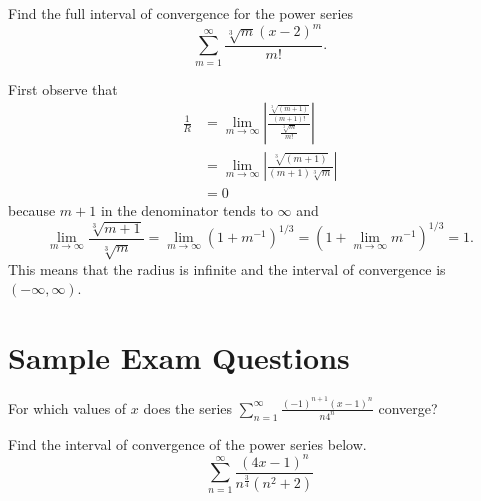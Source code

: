 \documentclass{ximera}
\begin{document}
\begin{question}%

Find the full interval of convergence for the power series \[\sum_{m=1}^{\infty} \frac{\sqrt[3]{m}(x - 2)^m }{m!}.\]
\begin{multiplechoice}
\choice{\(\displaystyle \left[1,3\right)\)}
\choice{\(\displaystyle \left(1,3\right]\)}
\choice{\(\displaystyle \left[1,3\right]\)}
\choice[correct]{\(\displaystyle \left(-\infty,\infty\right)\)}
\end{multiplechoice}
\begin{feedback}
First observe that 
\[\begin{aligned}
\frac{1}{R} & = \lim_{m\rightarrow \infty} \left| \frac{\frac{\sqrt[3]{{(m+1)}} }{{(m+1)}!} }{\frac{\sqrt[3]{m} }{m!}} \right| \\
& = \lim_{m\rightarrow \infty} \left| \frac{\sqrt[3]{{(m+1)}} }{(m+1)\sqrt[3]{m} } \right| \\
& = 0
\end{aligned}\]
because \(m+1\) in the denominator tends to \(\infty\) and \[\lim_{m \rightarrow \infty} \frac{\sqrt[3]{m+1}}{\sqrt[3]{m}} = \lim_{m \rightarrow \infty} \left( 1 + m^{-1} \right)^{1/3} = \left( 1 + \lim_{m \rightarrow \infty} m^{-1} \right)^{1/3} = 1.\]
This means that the radius is infinite and the interval of convergence is \((-\infty,\infty)\).
\end{feedback}

\end{question}

\section*{Sample Exam Questions}

\begin{question}%

For which values of \(x\) does the series \(\displaystyle \sum_{n=1}^\infty \frac{(-1)^{n+1}(x-1)^n}{n 4^n}\) converge?
\begin{multiplechoice}
\end{multiplechoice}

\end{question}

\begin{question}%

Find the interval of convergence of the power series below.
\[ \sum_{n=1}^\infty \frac{(4x-1)^n}{n^\frac{3}{4} (n^2+2)} \]
\begin{multiplechoice}
\choice{\(\displaystyle \left( 0 , \frac{1}{2} \right]\)}
\choice{\(\displaystyle \left[ 0 , \frac{1}{2} \right)\)}
\choice{\(\displaystyle \left( -\frac{1}{2} , 0\right]\)}
\choice{\(\left( - \infty, \infty \right)\)}
\end{multiplechoice}

\end{question}
\end{document}
